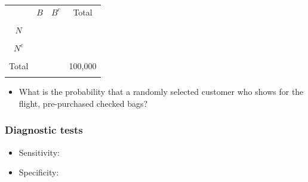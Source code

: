 \documentclass[
]{report}
\providecommand{\tightlist}{%
  \setlength{\itemsep}{0pt}\setlength{\parskip}{0pt}}
\begin{document}

\begin{center}
\begin{tabular}{|c|c|c|c|} \hline
\hspace{0.8in} & \hspace{0.35in} $B$ \hspace{.35in} & \hspace{0.35in} $B^c$  \hspace{0.35in} & \hspace{0.3in} Total \hspace{0.3in} \\ 
& & & \\ \hline
$N$& & & \\ 
& & & \\ \hline
$N^c$& & & \\ 
& & & \\ \hline
Total & & & 100,000 \\ 
& & & \\ \hline
\end{tabular}
\end{center}
\vspace{.1in}

\begin{itemize}
\tightlist
\item
  What is the probability that a randomly selected customer who shows for the flight, pre-purchased checked bags?
\end{itemize}

\vspace{1in}

\hypertarget{diagnostic-tests}{%
\subsubsection*{Diagnostic tests}\label{diagnostic-tests}}

\begin{itemize}
\tightlist
\item
  Sensitivity:
\end{itemize}

\vspace{0.3in}

\begin{itemize}
\tightlist
\item
  Specificity:
\end{itemize}

\vspace{0.3in}
\end{document}
